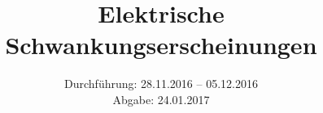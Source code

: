 
\usepackage{showframe}

\subject{Versuch 57}
\title{Elektrische Schwankungserscheinungen}
\date{Durchführung: 28.11.2016 -- 05.12.2016 \\
      Abgabe: 24.01.2017}



\maketitle
\newpage









\printbibliography


